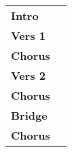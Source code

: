 
\begin{tabular}{p{1.6cm}l}
	\textbf{Intro}  & \\
	\textbf{Vers 1} & \\
	\textbf{Chorus} & \\
	\textbf{Vers 2} & \\
	\textbf{Chorus} & \\
	\textbf{Bridge} & \\
	\textbf{Chorus} & \\
\end{tabular}
